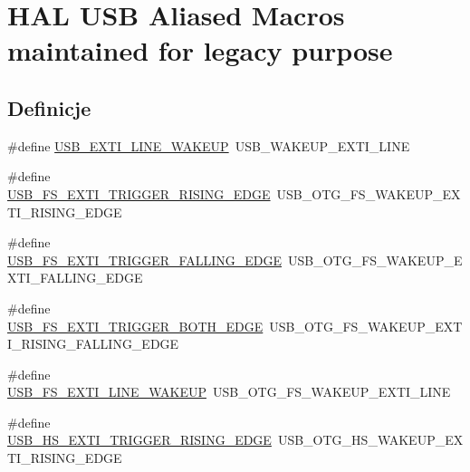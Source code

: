 \hypertarget{group___h_a_l___u_s_b___aliased___macros}{}\section{H\+AL U\+SB Aliased Macros maintained for legacy purpose}
\label{group___h_a_l___u_s_b___aliased___macros}
\subsection*{Definicje}
\begin{DoxyCompactItemize}
\item 
\#define \hyperlink{group___h_a_l___u_s_b___aliased___macros_ga61757a6baeb1b54c45949122b5cf9ba2}{U\+S\+B\+\_\+\+E\+X\+T\+I\+\_\+\+L\+I\+N\+E\+\_\+\+W\+A\+K\+E\+UP}~U\+S\+B\+\_\+\+W\+A\+K\+E\+U\+P\+\_\+\+E\+X\+T\+I\+\_\+\+L\+I\+NE
\item 
\#define \hyperlink{group___h_a_l___u_s_b___aliased___macros_ga4635bede79c31eb76839b0682657e31e}{U\+S\+B\+\_\+\+F\+S\+\_\+\+E\+X\+T\+I\+\_\+\+T\+R\+I\+G\+G\+E\+R\+\_\+\+R\+I\+S\+I\+N\+G\+\_\+\+E\+D\+GE}~U\+S\+B\+\_\+\+O\+T\+G\+\_\+\+F\+S\+\_\+\+W\+A\+K\+E\+U\+P\+\_\+\+E\+X\+T\+I\+\_\+\+R\+I\+S\+I\+N\+G\+\_\+\+E\+D\+GE
\item 
\#define \hyperlink{group___h_a_l___u_s_b___aliased___macros_ga61994671a8124f126378447f96f87843}{U\+S\+B\+\_\+\+F\+S\+\_\+\+E\+X\+T\+I\+\_\+\+T\+R\+I\+G\+G\+E\+R\+\_\+\+F\+A\+L\+L\+I\+N\+G\+\_\+\+E\+D\+GE}~U\+S\+B\+\_\+\+O\+T\+G\+\_\+\+F\+S\+\_\+\+W\+A\+K\+E\+U\+P\+\_\+\+E\+X\+T\+I\+\_\+\+F\+A\+L\+L\+I\+N\+G\+\_\+\+E\+D\+GE
\item 
\#define \hyperlink{group___h_a_l___u_s_b___aliased___macros_ga10b3c6190659b38d5e6d3155e30e3b5a}{U\+S\+B\+\_\+\+F\+S\+\_\+\+E\+X\+T\+I\+\_\+\+T\+R\+I\+G\+G\+E\+R\+\_\+\+B\+O\+T\+H\+\_\+\+E\+D\+GE}~U\+S\+B\+\_\+\+O\+T\+G\+\_\+\+F\+S\+\_\+\+W\+A\+K\+E\+U\+P\+\_\+\+E\+X\+T\+I\+\_\+\+R\+I\+S\+I\+N\+G\+\_\+\+F\+A\+L\+L\+I\+N\+G\+\_\+\+E\+D\+GE
\item 
\#define \hyperlink{group___h_a_l___u_s_b___aliased___macros_ga9990232132734bde77e11c4f8d2e4163}{U\+S\+B\+\_\+\+F\+S\+\_\+\+E\+X\+T\+I\+\_\+\+L\+I\+N\+E\+\_\+\+W\+A\+K\+E\+UP}~U\+S\+B\+\_\+\+O\+T\+G\+\_\+\+F\+S\+\_\+\+W\+A\+K\+E\+U\+P\+\_\+\+E\+X\+T\+I\+\_\+\+L\+I\+NE
\item 
\#define \hyperlink{group___h_a_l___u_s_b___aliased___macros_gabae8c431934cc5189524c41c4a413e5d}{U\+S\+B\+\_\+\+H\+S\+\_\+\+E\+X\+T\+I\+\_\+\+T\+R\+I\+G\+G\+E\+R\+\_\+\+R\+I\+S\+I\+N\+G\+\_\+\+E\+D\+GE}~U\+S\+B\+\_\+\+O\+T\+G\+\_\+\+H\+S\+\_\+\+W\+A\+K\+E\+U\+P\+\_\+\+E\+X\+T\+I\+\_\+\+R\+I\+S\+I\+N\+G\+\_\+\+E\+D\+GE

\end{DoxyCompactItemize}
